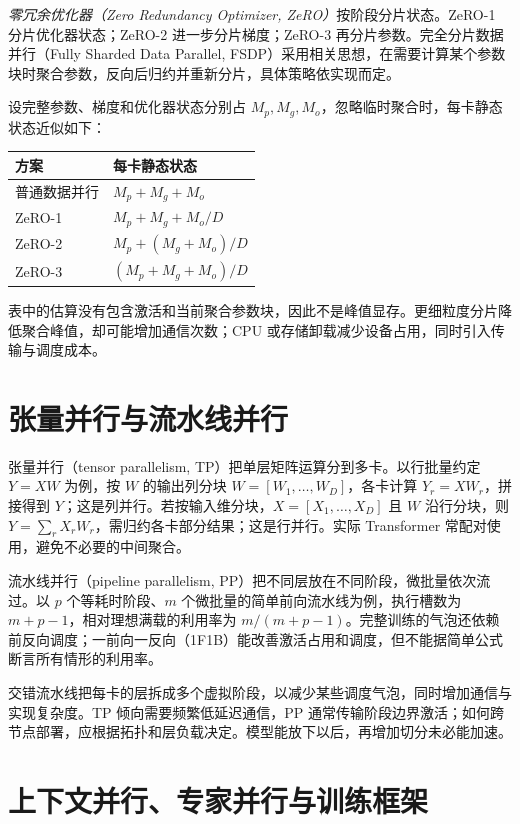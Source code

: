 \emph{零冗余优化器（Zero Redundancy Optimizer, ZeRO）}按阶段分片状态\cite{zero}。ZeRO-1 分片优化器状态；ZeRO-2 进一步分片梯度；ZeRO-3 再分片参数。完全分片数据并行（Fully Sharded Data Parallel, FSDP）采用相关思想，在需要计算某个参数块时聚合参数，反向后归约并重新分片，具体策略依实现而定。

设完整参数、梯度和优化器状态分别占 $M_p,M_g,M_o$，忽略临时聚合时，每卡静态状态近似如下：
\begin{center}
\begin{tabular}{ll}
\toprule
方案 & 每卡静态状态 \\
\midrule
普通数据并行 & $M_p+M_g+M_o$ \\
ZeRO-1 & $M_p+M_g+M_o/D$ \\
ZeRO-2 & $M_p+(M_g+M_o)/D$ \\
ZeRO-3 & $(M_p+M_g+M_o)/D$ \\
\bottomrule
\end{tabular}
\end{center}
表中的估算没有包含激活和当前聚合参数块，因此不是峰值显存。更细粒度分片降低聚合峰值，却可能增加通信次数；CPU 或存储卸载减少设备占用，同时引入传输与调度成本。

\section{张量并行与流水线并行}

张量并行（tensor parallelism, TP）把单层矩阵运算分到多卡。以行批量约定 $Y=XW$ 为例，按 $W$ 的输出列分块 $W=[W_1,\ldots,W_D]$，各卡计算 $Y_r=XW_r$，拼接得到 $Y$；这是列并行。若按输入维分块，$X=[X_1,\ldots,X_D]$ 且 $W$ 沿行分块，则 $Y=\sum_rX_rW_r$，需归约各卡部分结果；这是行并行。实际 Transformer 常配对使用，避免不必要的中间聚合。

流水线并行（pipeline parallelism, PP）把不同层放在不同阶段，微批量依次流过。以 $p$ 个等耗时阶段、$m$ 个微批量的简单前向流水线为例，执行槽数为 $m+p-1$，相对理想满载的利用率为 $m/(m+p-1)$。完整训练的气泡还依赖前反向调度；一前向一反向（1F1B）能改善激活占用和调度，但不能据简单公式断言所有情形的利用率。

交错流水线把每卡的层拆成多个虚拟阶段，以减少某些调度气泡，同时增加通信与实现复杂度。TP 倾向需要频繁低延迟通信，PP 通常传输阶段边界激活；如何跨节点部署，应根据拓扑和层负载决定。模型能放下以后，再增加切分未必能加速。

\section{上下文并行、专家并行与训练框架}

